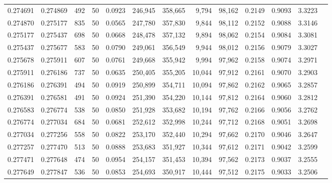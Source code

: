 \begin{tabular}{rrrrrrrrrrrrr}
0.274691 & 0.274869 &   492 &  50 &                                     0.0923 & 246,945 & 358,665 &   9,794 &  98,162 & 0.2149 & 0.9093 & 3.3223 \\
0.274870 & 0.275177 &   835 &  50 &                                     0.0565 & 247,780 & 357,830 &   9,844 &  98,112 & 0.2152 & 0.9088 & 3.3146 \\
0.275177 & 0.275437 &   698 &  50 &                                     0.0668 & 248,478 & 357,132 &   9,894 &  98,062 & 0.2154 & 0.9084 & 3.3081 \\
0.275437 & 0.275677 &   583 &  50 &                                     0.0790 & 249,061 & 356,549 &   9,944 &  98,012 & 0.2156 & 0.9079 & 3.3027 \\
0.275678 & 0.275911 &   607 &  50 &                                     0.0761 & 249,668 & 355,942 &   9,994 &  97,962 & 0.2158 & 0.9074 & 3.2971 \\
0.275911 & 0.276186 &   737 &  50 &                                     0.0635 & 250,405 & 355,205 &  10,044 &  97,912 & 0.2161 & 0.9070 & 3.2903 \\
0.276186 & 0.276391 &   494 &  50 &                                     0.0919 & 250,899 & 354,711 &  10,094 &  97,862 & 0.2162 & 0.9065 & 3.2857 \\
0.276391 & 0.276581 &   491 &  50 &                                     0.0924 & 251,390 & 354,220 &  10,144 &  97,812 & 0.2164 & 0.9060 & 3.2812 \\
0.276583 & 0.276774 &   538 &  50 &                                     0.0850 & 251,928 & 353,682 &  10,194 &  97,762 & 0.2166 & 0.9056 & 3.2762 \\
0.276774 & 0.277034 &   684 &  50 &                                     0.0681 & 252,612 & 352,998 &  10,244 &  97,712 & 0.2168 & 0.9051 & 3.2698 \\
0.277034 & 0.277256 &   558 &  50 &                                     0.0822 & 253,170 & 352,440 &  10,294 &  97,662 & 0.2170 & 0.9046 & 3.2647 \\
0.277257 & 0.277470 &   513 &  50 &                                     0.0888 & 253,683 & 351,927 &  10,344 &  97,612 & 0.2171 & 0.9042 & 3.2599 \\
0.277471 & 0.277648 &   474 &  50 &                                     0.0954 & 254,157 & 351,453 &  10,394 &  97,562 & 0.2173 & 0.9037 & 3.2555 \\
0.277649 & 0.277847 &   536 &  50 &                                     0.0853 & 254,693 & 350,917 &  10,444 &  97,512 & 0.2175 & 0.9033 & 3.2506 \\

\end{tabular}
